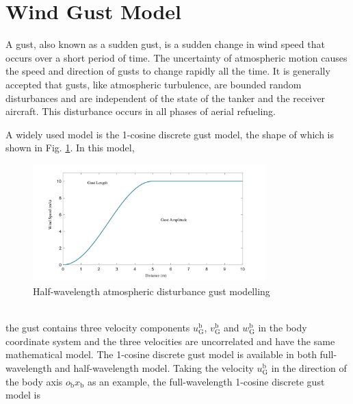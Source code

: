 \section{Wind Gust Model}
A gust, also known as a sudden gust, is a sudden change in wind speed that occurs over a short period of time. The uncertainty of atmospheric motion causes the speed and direction of gusts to change rapidly all the time. It is generally accepted that gusts, like atmospheric turbulence, are bounded random disturbances and are independent of the state of the tanker and the receiver aircraft. This disturbance occurs in all phases of aerial refueling.

A widely used model is the 1-cosine discrete gust model, the shape of which is shown in Fig. \ref{fig1}. In this model,
\begin{figure}[th]
	\centering
	\includegraphics[width=0.8\textwidth]{Figures/Figs_Ch4/fig1.pdf}
	\caption{Half-wavelength atmospheric disturbance gust modelling\cite{ly1980time}}\label{fig1}
\end{figure}\\
the gust contains three velocity components $u_{\mathrm{G}}^{\mathrm{b}}$, $v_{\mathrm{G}}^{\mathrm{b}}$ and $w_{\mathrm{G}}^{\mathrm{b}}$ in the body coordinate system and the three velocities are uncorrelated and have the same mathematical model. The 1-cosine discrete gust model is available in both full-wavelength and half-wavelength model. Taking the velocity $u_{\mathrm{G}}^{\mathrm{b}}$ in the direction of the body axis $o_{\mathrm{b}}x_{\mathrm{b}}$ as an example, the full-wavelength 1-cosine discrete gust model is

